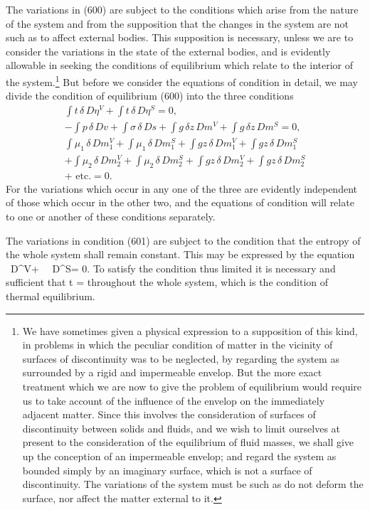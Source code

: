 \documentclass[12pt]{article}
\newcommand{\dd}{\delta}
\begin{document}
The variations in (600) are subject to the conditions which arise from the nature of the system and from the supposition that the changes in the system are not such as to affect external bodies. This supposition is necessary, unless we are to consider the variations in the state of the external bodies, and is evidently allowable in seeking the conditions of equilibrium which relate to the interior of the system.\footnote{We have sometimes given a physical expression to a supposition of this kind, in problems in which the peculiar condition of matter in the vicinity of surfaces of discontinuity was to be neglected, by regarding the system as surrounded by a rigid and impermeable envelop. But the more exact treatment which we are now to give the problem of equilibrium would require us to take account of the influence of the envelop on the immediately adjacent matter. Since this involves the consideration of surfaces of discontinuity between solids and fluids, and we wish to limit ourselves at present to the consideration of the equilibrium of fluid masses, we shall give up the conception of an impermeable envelop; and regard the system as bounded simply by an imaginary surface, which is not a surface of discontinuity. The variations of the system must be such as do not deform the surface, nor affect the matter external to it.} But before we consider the equations of condition in detail, we may divide the condition of equilibrium (600) into the three conditions
\begin{gather}\int t \, \dd \, D\eta^V+ \int t \, \dd \, D\eta^S = 0,   \label{601} \\
-\int p \, \dd \, Dv + \int \sigma \, \dd \, Ds + \int g \, \dd z \, Dm^V +\int g \, \dd z \, Dm^S = 0,  \label{602} \\
\int \mu_1 \,\dd\,Dm_1^V +  \int \mu_1 \,\dd\,Dm_1^S + \int gz \, \dd \, Dm_1^V+ \int gz \, \dd \, Dm_1^S \nonumber \\
+\int \mu_2 \,\dd\,Dm_2^V +  \int \mu_2 \,\dd\,Dm_2^S + \int gz \, \dd \, Dm_2^V+ \int gz \, \dd \, Dm_2^S  \nonumber \\
+ \text{ etc.} = 0.   \label{603} \end{gather}
For the variations which occur in any one of the three are evidently independent of those which occur in the other two, and the equations of condition will relate to one or another of these conditions separately.

The variations in condition (601) are subject to the condition that the entropy of the whole system shall remain constant. This may be expressed by the equation
\eqs \int \, \dd \, D\eta^V+ \int \, \dd \, D\eta^S= 0.  \label{604} \eqe
To satisfy the condition thus limited it is necessary and sufficient that
\eqs t =   \label{605} \eqe
throughout the whole system, which is the condition of thermal equilibrium.
\end{document}
